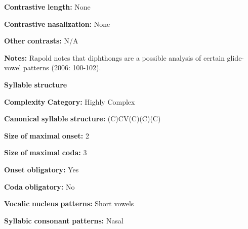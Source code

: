 \documentclass[output=paper]{langsci/langscibook}
\begin{document}
\begin{styleBody}
\textbf{Contrastive} \textbf{length:} None
\end{styleBody}

\begin{styleBody}
\textbf{Contrastive} \textbf{nasalization:} None
\end{styleBody}

\begin{styleBody}
\textbf{Other} \textbf{contrasts:} N/A
\end{styleBody}

\begin{styleBody}
\textbf{Notes:} Rapold notes that diphthongs are a possible analysis of certain glide-vowel patterns (2006: 100-102).
\end{styleBody}

\begin{styleBody}
\textbf{Syllable} \textbf{structure}
\end{styleBody}

\begin{styleBody}
\textbf{Complexity} \textbf{Category:} Highly Complex
\end{styleBody}

\begin{styleBody}
\textbf{Canonical} \textbf{syllable} \textbf{structure:} (C)CV(C)(C)(C) \citep[91-112]{Rapold2006}
\end{styleBody}

\begin{styleBody}
\textbf{Size} \textbf{of} \textbf{maximal} \textbf{onset:} 2
\end{styleBody}

\begin{styleBody}
\textbf{Size} \textbf{of} \textbf{maximal} \textbf{coda:} 3
\end{styleBody}

\begin{styleBody}
\textbf{Onset} \textbf{obligatory:} Yes
\end{styleBody}

\begin{styleBody}
\textbf{Coda} \textbf{obligatory:} No
\end{styleBody}

\begin{styleBody}
\textbf{Vocalic} \textbf{nucleus} \textbf{patterns:} Short vowels
\end{styleBody}

\begin{styleBody}
\textbf{Syllabic} \textbf{consonant} \textbf{patterns:} Nasal
\end{styleBody}
\end{document}
